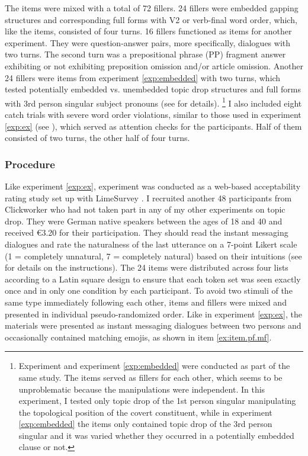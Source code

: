 The items were mixed with a total of 72 fillers.
24 fillers were embedded gapping structures and corresponding full forms with V2 or verb-final word order, which, like the items, consisted of four turns.
16 fillers functioned as items for another experiment.
They were question-answer pairs, more specifically, dialogues with two turns.
The second turn was a prepositional phrase (PP) fragment answer exhibiting or not exhibiting preposition omission and/or article omission.
Another 24 fillers were items from experiment \ref*{exp:embedded} with two turns, which tested potentially embedded vs. unembedded topic drop structures and full forms with 3rd person singular subject pronouns (see  for details).%
\footnote{Experiment  and experiment \ref*{exp:embedded} were conducted as part of the same study.
The items served as fillers for each other, which seems to be unproblematic because the manipulations were independent.
In this experiment, I tested only topic drop of the 1st person singular manipulating the topological position of the covert constituent, while in experiment \ref*{exp:embedded} the items only contained topic drop of the 3rd person singular and it was varied whether they occurred in a potentially embedded clause or not. 
}
%
I also included eight catch trials with severe word order violations, similar to those used in experiment \ref*{exp:ex} (see ), which served as attention checks for the participants.
Half of them consisted of two turns, the other half of four turns.

\subsubsection{Procedure} \label{sec:exp.pf.mf.procedure}
Like experiment \ref*{exp:ex}, experiment  was conducted as a web-based acceptability rating study set up with LimeSurvey \citep{limesurveygmbh}.
I recruited another 48 participants from Clickworker \citep{clickworker2022} who had not taken part in any of my other experiments on topic drop.
They were German native speakers between the ages of 18 and 40 and received €3.20 for their participation.
They should read the instant messaging dialogues and rate the naturalness of the last utterance on a 7-point Likert scale (1 = completely unnatural, 7 = completely natural) based on their intuitions (see  for details on the instructions).
The 24 items were distributed across four lists according to a Latin square design to ensure that each token set was seen exactly once and in only one condition by each participant.
To avoid two stimuli of the same type immediately following each other, items and fillers were mixed and presented in individual pseudo-randomized order.
Like in experiment \ref*{exp:ex}, the materials were presented as instant messaging dialogues between two persons and occasionally contained matching emojis, as shown in item \ref{ex:item.pf.mf}.

